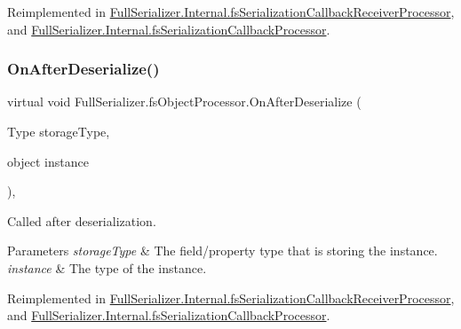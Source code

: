Reimplemented in \hyperlink{class_full_serializer_1_1_internal_1_1fs_serialization_callback_receiver_processor_ae3e6db6e345aea48bb0cb8e63e8f4d6f}{Full\+Serializer.\+Internal.\+fs\+Serialization\+Callback\+Receiver\+Processor}, and \hyperlink{class_full_serializer_1_1_internal_1_1fs_serialization_callback_processor_a78a0e22235867c360c341f0772d506a1}{Full\+Serializer.\+Internal.\+fs\+Serialization\+Callback\+Processor}.

\mbox{\label{class_full_serializer_1_1fs_object_processor_a147c5f6828b9cf92703152ee7e1611dd}} 
\subsubsection{\texorpdfstring{On\+After\+Deserialize()}{OnAfterDeserialize()}}
{\footnotesize\ttfamily virtual void Full\+Serializer.\+fs\+Object\+Processor.\+On\+After\+Deserialize (\begin{DoxyParamCaption}\item[{Type}]{storage\+Type,  }\item[{object}]{instance }\end{DoxyParamCaption})\hspace{0.3cm}{\ttfamily [inline]}, {\ttfamily [virtual]}}



Called after deserialization. 


\begin{DoxyParams}{Parameters}
{\em storage\+Type} & The field/property type that is storing the instance.\\
\hline
{\em instance} & The type of the instance.\\
\hline
\end{DoxyParams}


Reimplemented in \hyperlink{class_full_serializer_1_1_internal_1_1fs_serialization_callback_receiver_processor_a29733358c2bfa204e3a043fbc28d644d}{Full\+Serializer.\+Internal.\+fs\+Serialization\+Callback\+Receiver\+Processor}, and \hyperlink{class_full_serializer_1_1_internal_1_1fs_serialization_callback_processor_a18c88f0c5eb32dc01457fbbeaffe9f4a}{Full\+Serializer.\+Internal.\+fs\+Serialization\+Callback\+Processor}.

